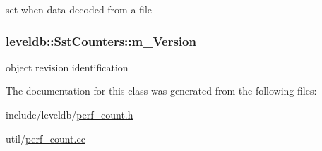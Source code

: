 set when data decoded from a file 

\hypertarget{classleveldb_1_1_sst_counters_a30b74b17770fae764fd614ead8e0d33c}{}
\subsubsection[{m\+\_\+\+Version}]{ leveldb\+::\+Sst\+Counters\+::m\+\_\+\+Version\hspace{0.3cm}{\ttfamily [protected]}}\label{classleveldb_1_1_sst_counters_a30b74b17770fae764fd614ead8e0d33c}


object revision identification 



The documentation for this class was generated from the following files\+:\begin{DoxyCompactItemize}
\item 
include/leveldb/\hyperlink{perf__count_8h}{perf\+\_\+count.\+h}\item 
util/\hyperlink{perf__count_8cc}{perf\+\_\+count.\+cc}\end{DoxyCompactItemize}
